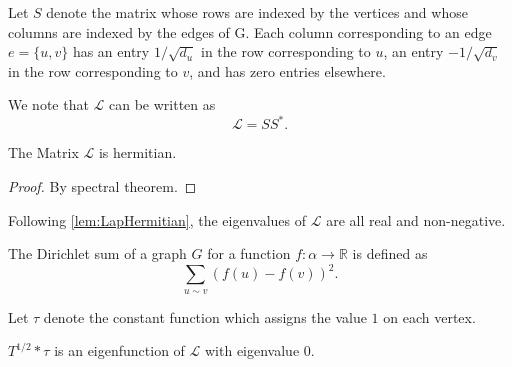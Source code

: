 \begin{definition}
\label{def:S}
\leanok
Let $S$ denote the matrix whose rows are indexed by the vertices and whose columns
are indexed by the edges of G. Each column corresponding to an edge $e = \{u, v\}$
has an entry $1/\sqrt{d_u}$ in the row corresponding to $u$, an entry $−1/\sqrt{d_v}$ in
the row corresponding to $v$, and has zero entries elsewhere.
\end{definition}



\begin{lemma}
\label{lem:LSS}
We note that $\mathcal{L}$ can be written as
\[
\mathcal{L} = SS^*.
\]
\end{lemma}



\begin{lemma}
\label{lem:LapHermitian}
\leanok
The Matrix $\mathcal{L}$ is hermitian.
\end{lemma}

\begin{proof}
By spectral theorem.
\end{proof}



\begin{definition}
\label{def:lapEigvals}
\leanok
Following \ref{lem:LapHermitian}, the eigenvalues of $\mathcal{L}$ are all real and non-negative.
\end{definition}




\begin{definition}
\label{def:DirichletSum}
\leanok
The Dirichlet sum of a graph $G$ for a function $f : \alpha \to \mathbb{R}$ is defined as
\[
\sum_{u \sim v}{(f(u)-f(v))^2}.
\]
\end{definition}




\begin{definition}
Let $\tau$ denote the constant function which assigns the value $1$ on each vertex.
\end{definition}


\begin{theorem}
\label{thm:zero_mem_lapSpectrum}
\leanok
$T^{1/2} * \tau$ is an eigenfunction of $\mathcal{L}$ with eigenvalue $0$.
\end{theorem}



